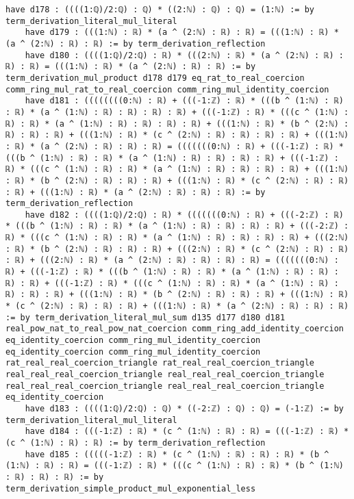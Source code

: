 \documentclass{article}
\begin{document}
\begin{tcolorbox}[colback=white!10, width=\linewidth]
\begin{lstlisting}[language=Lean4]
    have d178 : ((((1:ℚ)/2:ℚ) : ℚ) * ((2:ℕ) : ℚ) : ℚ) = (1:ℕ) := by term_derivation_literal_mul_literal
    have d179 : (((1:ℕ) : ℝ) * (a ^ (2:ℕ) : ℝ) : ℝ) = (((1:ℕ) : ℝ) * (a ^ (2:ℕ) : ℝ) : ℝ) := by term_derivation_reflection
    have d180 : ((((1:ℚ)/2:ℚ) : ℝ) * (((2:ℕ) : ℝ) * (a ^ (2:ℕ) : ℝ) : ℝ) : ℝ) = (((1:ℕ) : ℝ) * (a ^ (2:ℕ) : ℝ) : ℝ) := by term_derivation_mul_product d178 d179 eq_rat_to_real_coercion comm_ring_mul_rat_to_real_coercion comm_ring_mul_identity_coercion
    have d181 : ((((((((0:ℕ) : ℝ) + (((-1:ℤ) : ℝ) * (((b ^ (1:ℕ) : ℝ) : ℝ) * (a ^ (1:ℕ) : ℝ) : ℝ) : ℝ) : ℝ) + (((-1:ℤ) : ℝ) * (((c ^ (1:ℕ) : ℝ) : ℝ) * (a ^ (1:ℕ) : ℝ) : ℝ) : ℝ) : ℝ) + (((1:ℕ) : ℝ) * (b ^ (2:ℕ) : ℝ) : ℝ) : ℝ) + (((1:ℕ) : ℝ) * (c ^ (2:ℕ) : ℝ) : ℝ) : ℝ) : ℝ) + (((1:ℕ) : ℝ) * (a ^ (2:ℕ) : ℝ) : ℝ) : ℝ) = (((((((0:ℕ) : ℝ) + (((-1:ℤ) : ℝ) * (((b ^ (1:ℕ) : ℝ) : ℝ) * (a ^ (1:ℕ) : ℝ) : ℝ) : ℝ) : ℝ) + (((-1:ℤ) : ℝ) * (((c ^ (1:ℕ) : ℝ) : ℝ) * (a ^ (1:ℕ) : ℝ) : ℝ) : ℝ) : ℝ) + (((1:ℕ) : ℝ) * (b ^ (2:ℕ) : ℝ) : ℝ) : ℝ) + (((1:ℕ) : ℝ) * (c ^ (2:ℕ) : ℝ) : ℝ) : ℝ) + (((1:ℕ) : ℝ) * (a ^ (2:ℕ) : ℝ) : ℝ) : ℝ) := by term_derivation_reflection
    have d182 : ((((1:ℚ)/2:ℚ) : ℝ) * (((((((0:ℕ) : ℝ) + (((-2:ℤ) : ℝ) * (((b ^ (1:ℕ) : ℝ) : ℝ) * (a ^ (1:ℕ) : ℝ) : ℝ) : ℝ) : ℝ) + (((-2:ℤ) : ℝ) * (((c ^ (1:ℕ) : ℝ) : ℝ) * (a ^ (1:ℕ) : ℝ) : ℝ) : ℝ) : ℝ) + (((2:ℕ) : ℝ) * (b ^ (2:ℕ) : ℝ) : ℝ) : ℝ) + (((2:ℕ) : ℝ) * (c ^ (2:ℕ) : ℝ) : ℝ) : ℝ) + (((2:ℕ) : ℝ) * (a ^ (2:ℕ) : ℝ) : ℝ) : ℝ) : ℝ) = (((((((0:ℕ) : ℝ) + (((-1:ℤ) : ℝ) * (((b ^ (1:ℕ) : ℝ) : ℝ) * (a ^ (1:ℕ) : ℝ) : ℝ) : ℝ) : ℝ) + (((-1:ℤ) : ℝ) * (((c ^ (1:ℕ) : ℝ) : ℝ) * (a ^ (1:ℕ) : ℝ) : ℝ) : ℝ) : ℝ) + (((1:ℕ) : ℝ) * (b ^ (2:ℕ) : ℝ) : ℝ) : ℝ) + (((1:ℕ) : ℝ) * (c ^ (2:ℕ) : ℝ) : ℝ) : ℝ) + (((1:ℕ) : ℝ) * (a ^ (2:ℕ) : ℝ) : ℝ) : ℝ) := by term_derivation_literal_mul_sum d135 d177 d180 d181 real_pow_nat_to_real_pow_nat_coercion comm_ring_add_identity_coercion eq_identity_coercion comm_ring_mul_identity_coercion eq_identity_coercion comm_ring_mul_identity_coercion rat_real_real_coercion_triangle rat_real_real_coercion_triangle real_real_real_coercion_triangle real_real_real_coercion_triangle real_real_real_coercion_triangle real_real_real_coercion_triangle eq_identity_coercion
    have d183 : ((((1:ℚ)/2:ℚ) : ℚ) * ((-2:ℤ) : ℚ) : ℚ) = (-1:ℤ) := by term_derivation_literal_mul_literal
    have d184 : (((-1:ℤ) : ℝ) * (c ^ (1:ℕ) : ℝ) : ℝ) = (((-1:ℤ) : ℝ) * (c ^ (1:ℕ) : ℝ) : ℝ) := by term_derivation_reflection
    have d185 : (((((-1:ℤ) : ℝ) * (c ^ (1:ℕ) : ℝ) : ℝ) : ℝ) * (b ^ (1:ℕ) : ℝ) : ℝ) = (((-1:ℤ) : ℝ) * (((c ^ (1:ℕ) : ℝ) : ℝ) * (b ^ (1:ℕ) : ℝ) : ℝ) : ℝ) := by term_derivation_simple_product_mul_exponential_less

\end{lstlisting}
\end{tcolorbox}
\end{document}
